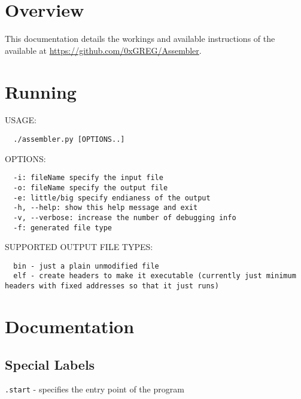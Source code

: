 \documentclass{article}
\begin{document}
\maketitle
\tableofcontents

\section{Overview}
This documentation details the workings and available instructions of the \programname available at \url{https://github.com/0xGREG/Assembler}.

\section{Running \programname}

USAGE:
\begin{lstlisting}
  ./assembler.py [OPTIONS..]
\end{lstlisting}

\noindent
OPTIONS:
\begin{lstlisting}
  -i: fileName specify the input file
  -o: fileName specify the output file
  -e: little/big specify endianess of the output
  -h, --help: show this help message and exit
  -v, --verbose: increase the number of debugging info
  -f: generated file type
\end{lstlisting}

\noindent
SUPPORTED OUTPUT FILE TYPES:
\begin{lstlisting}
  bin - just a plain unmodified file
  elf - create headers to make it executable (currently just minimum headers with fixed addresses so that it just runs)
\end{lstlisting}

\section{Documentation}
\subsection{Special Labels}
\texttt{.start} - specifies the entry point of the program
\end{document}
